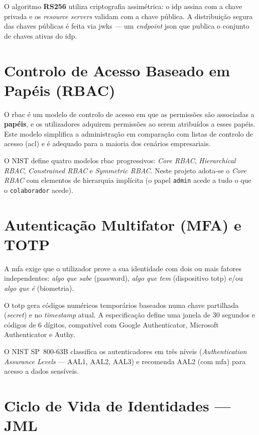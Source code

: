 O algoritmo \textbf{RS256} utiliza criptografia assimétrica: o \gls{idp} assina com a chave privada e os \textit{resource servers} validam com a chave pública. A distribuição segura das chaves públicas é feita via \gls{jwks} \cite{RFC7517} — um \textit{endpoint} \gls{json} que publica o conjunto de chaves ativas do \gls{idp}.

\section{Controlo de Acesso Baseado em Papéis (RBAC)}

O \gls{rbac} \cite{Ferraiolo1992} é um modelo de controlo de acesso em que as permissões são associadas a \textbf{papéis}, e os utilizadores adquirem permissões ao serem atribuídos a esses papéis. Este modelo simplifica a administração em comparação com listas de controlo de acesso (\gls{acl}) e é adequado para a maioria dos cenários empresariais.

O NIST define quatro modelos \gls{rbac} progressivos: \textit{Core RBAC}, \textit{Hierarchical RBAC}, \textit{Constrained RBAC} e \textit{Symmetric RBAC}. Neste projeto adota-se o \textit{Core RBAC} com elementos de hierarquia implícita (o papel \texttt{admin} acede a tudo o que o \texttt{colaborador} acede).

\section{Autenticação Multifator (MFA) e TOTP}

A \gls{mfa} \cite{NIST80063B} exige que o utilizador prove a sua identidade com dois ou mais fatores independentes: \textit{algo que sabe} (password), \textit{algo que tem} (dispositivo \gls{totp}) e/ou \textit{algo que é} (biometria).

O \gls{totp} \cite{RFC6238} gera códigos numéricos temporários baseados numa chave partilhada (\textit{secret}) e no \textit{timestamp} atual. A especificação define uma janela de 30 segundos e códigos de 6 dígitos, compatível com Google Authenticator, Microsoft Authenticator e Authy.

O NIST SP~800-63B classifica os autenticadores em três níveis (\textit{Authentication Assurance Levels} — AAL1, AAL2, AAL3) e recomenda AAL2 (com \gls{mfa}) para acesso a dados sensíveis.

\section{Ciclo de Vida de Identidades — JML}

